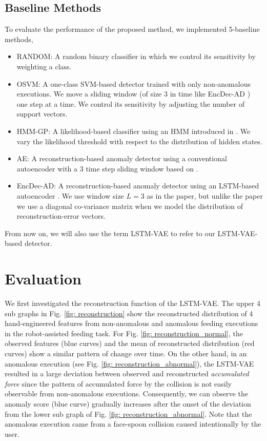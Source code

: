 \documentclass[letterpaper, 10 pt, conference]{ieeeconf}
\begin{document}
\subsection{Baseline Methods}
To evaluate the performance of the proposed method, we implemented 5-baseline methods,
\begin{itemize}
\item RANDOM: A random binary classifier in which we control its sensitivity by weighting a class.
\item OSVM: A one-class SVM-based detector trained with only non-anomalous executions. We move a sliding window (of size 3 in time like EncDec-AD \cite{malhotra2016lstm}) one step at a time. We control its sensitivity by adjusting the number of support vectors.
\item HMM-GP: A likelihood-based classifier using an HMM introduced in \cite{park2017detection}. We vary the likelihood threshold with respect to the distribution of hidden states.
\item AE: A reconstruction-based anomaly detector using a conventional autoencoder with a 3 time step sliding window based on \cite{an2015variational}.
\item EncDec-AD: A reconstruction-based anomaly detector using an LSTM-based autoencoder \cite{malhotra2016lstm}. We use window size $L=3$ as in the paper, but unlike the paper we use a diagonal co-variance matrix when we model the distribution of reconstruction-error vectors.
\end{itemize}
From now on, we will also use the term LSTM-VAE to refer to our LSTM-VAE-based detector.

\section{Evaluation}

We first investigated the reconstruction function of the LSTM-VAE. The upper 4 sub graphs in Fig. \ref{fig: reconstruction} show the reconstructed distribution of 4 hand-engineered features from non-anomalous and anomalous feeding executions in the robot-assisted feeding task. For Fig. \ref{fig: reconstruction_normal}, the observed features (blue curves) and the mean of reconstructed distribution (red curves) show a similar pattern of change over time. On the other hand, in an anomalous execution (see Fig. \ref{fig: reconstruction_abnormal}), the LSTM-VAE resulted in a large deviation between observed and reconstructed \textit{accumulated force} since the pattern of accumulated force by the collision is not easily observable from non-anomalous executions. Consequently, we can observe the anomaly score (blue curve) gradually increases after the onset of the deviation from the lower sub graph of Fig. \ref{fig: reconstruction_abnormal}. Note that the anomalous execution came from a face-spoon collision caused intentionally by the user.
\end{document}
